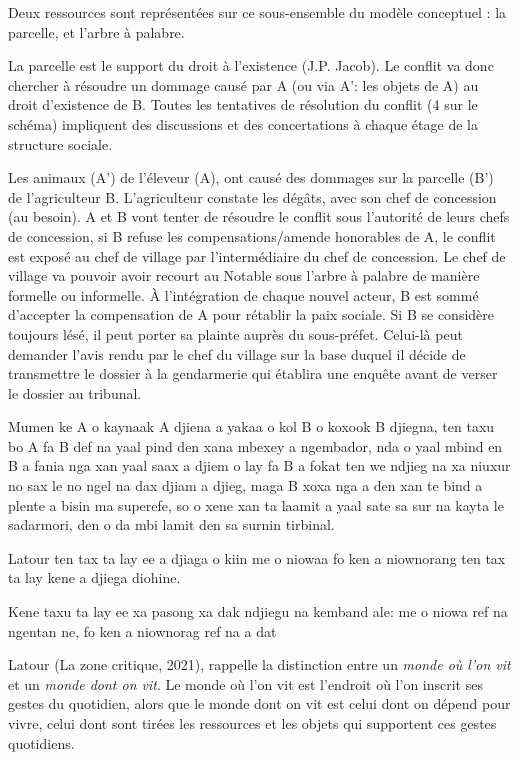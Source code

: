\begin{paracol}{2}

  Deux ressources sont représentées sur ce sous-ensemble du modèle conceptuel : la parcelle, et l'arbre à palabre.

  La parcelle est le support du droit à l'existence (J.P. Jacob). Le conflit va donc chercher à résoudre un dommage causé par A (ou via A': les objets de A) au droit d'existence de B. Toutes les tentatives de résolution du conflit (4 sur le schéma) impliquent des discussions et des concertations à chaque étage de la structure sociale.

  Les animaux (A') de l'éleveur (A), ont causé des dommages sur la parcelle (B') de l'agriculteur B. L'agriculteur constate les dégâts, avec son chef de concession (au besoin). A et B vont tenter de résoudre le conflit sous l'autorité de leurs chefs de concession, si B refuse les compensations/amende honorables de A, le conflit est exposé au chef de village par l'intermédiaire du chef de concession. Le chef de village va pouvoir avoir recourt au Notable sous l'arbre à palabre de manière formelle ou informelle. À l'intégration de chaque nouvel acteur, B est sommé d'accepter la compensation de A pour rétablir la paix sociale. Si B se considère toujours lésé, il peut porter sa plainte auprès du sous-préfet. Celui-là peut demander l'avis rendu par le chef du village sur la base duquel il décide de transmettre le dossier à la gendarmerie qui établira une enquête avant de verser le dossier au tribunal.

  \switchcolumn %

  Mumen ke A o kaynaak A djiena a yakaa o kol B o koxook B djiegna, ten taxu bo A fa B def na yaal pind den xana mbexey a ngembador, nda o yaal mbind en B a fania nga xan yaal saax a djiem o lay fa B a fokat ten we ndjieg na xa niuxur no sax le no ngel na dax djiam a djieg, maga B xoxa nga a den xan te bind a plente a bisin ma superefe, so o xene xan ta laamit a yaal sate sa sur na kayta le sadarmori, den o da mbi lamit den sa surnin tirbinal.

  Latour ten tax ta lay ee a djiaga o kiin me o niowaa fo ken a niownorang ten tax ta lay kene a djiega diohine.

  Kene taxu ta lay ee xa pasong xa dak ndjiegu na kemband ale: me o niowa ref na ngentan ne, fo ken a niownorag ref na a dat

  \switchcolumn %

  Latour (La zone critique, 2021), rappelle la distinction entre  un \textit{monde où l'on vit} et un \textit{monde dont on vit}. Le monde où l'on vit  est l'endroit où l'on inscrit ses gestes du quotidien, alors que le monde dont on vit est  celui dont on dépend pour vivre, celui dont sont tirées les ressources et les objets qui supportent ces gestes quotidiens.


\end{paracol}
